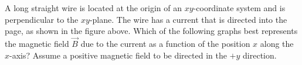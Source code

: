 \begin{questions}\setcounter{question}{20}\question
A long straight wire is located at the origin of an $x y$-coordinate system and is perpendicular to the $x y$-plane. The wire has a current that is directed into the page, as shown in the figure above. Which of the following graphs best represents the magnetic field $\vec{B}$ due to the current as a function of the position $x$ along the $x$-axis? Assume a positive magnetic field to be directed in the $+y$ direction.

\begin{oneparchoices}
\choice {}
\choice {}
\choice {}

\end{oneparchoices}
\end{questions}

